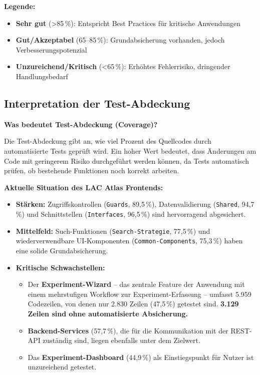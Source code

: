 \textbf{Legende:}
\begin{itemize}[noitemsep]
	\item \textcolor{green!70!black}{} \textbf{Sehr gut} (>85\,\%): Entspricht Best Practices für kritische Anwendungen
	\item \textcolor{orange}{} \textbf{Gut/Akzeptabel} (65--85\,\%): Grundabsicherung vorhanden, jedoch Verbesserungspotenzial
	\item \textcolor{red}{} \textbf{Unzureichend/Kritisch} (<65\,\%): Erhöhtes Fehlerrisiko, dringender Handlungsbedarf
\end{itemize}

\vspace{1cm}


\subsection*{Interpretation der Test-Abdeckung}

\textbf{Was bedeutet Test-Abdeckung (Coverage)?}

Die Test-Abdeckung gibt an, wie viel Prozent des Quellcodes durch automatisierte Tests geprüft wird. Ein hoher Wert bedeutet, dass Änderungen am Code mit geringerem Risiko durchgeführt werden können, da Tests automatisch prüfen, ob bestehende Funktionen noch korrekt arbeiten.

\textbf{Aktuelle Situation des LAC Atlas Frontends:}

\begin{itemize}
	\item \textbf{Stärken:} Zugriffskontrollen (\texttt{Guards}, 89,5\,\%), Datenvalidierung (\texttt{Shared}, 94,7\,\%) und Schnittstellen (\texttt{Interfaces}, 96,5\,\%) sind hervorragend abgesichert.

	\item \textbf{Mittelfeld:} Such-Funktionen (\texttt{Search-Strategie}, 77,5\,\%) und wiederverwendbare UI-Komponenten (\texttt{Common-Components}, 75,3\,\%) haben eine solide Grundabsicherung.

	\item \textbf{Kritische Schwachstellen:}
	\begin{itemize}
		\item Der \textbf{Experiment-Wizard} -- das zentrale Feature der Anwendung mit einem mehrstufigen Workflow zur Experiment-Erfassung -- umfasst 5.959 Codezeilen, von denen nur 2.830 Zeilen (47,5\,\%) getestet sind. \textbf{3.129 Zeilen sind ohne automatisierte Absicherung.}
		\item \textbf{Backend-Services} (57,7\,\%), die für die Kommunikation mit der REST-API zuständig sind, liegen ebenfalls unter dem Zielwert.
		\item Das \textbf{Experiment-Dashboard} (44,9\,\%) als Einstiegspunkt für Nutzer ist unzureichend getestet.
	\end{itemize}
\end{itemize}

